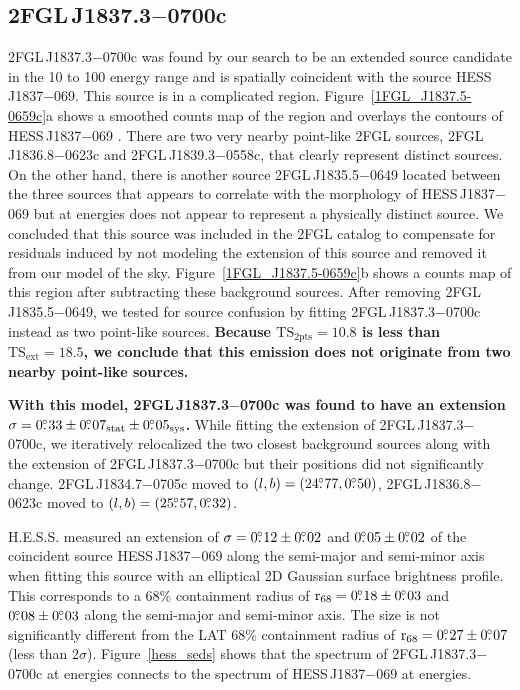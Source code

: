 \documentclass[12pt,preprint]{aastex}
\newcommand{\gev}{\text{GeV}\xspace}
\newcommand{\tev}{\text{TeV}\xspace}
\newcommand{\tsext}{{\ensuremath{\text{TS}_{\text{ext}}}}\xspace}
\newcommand{\tsinc}{\ensuremath{\text{TS}_{\text{2pts}}}\xspace}
\newcommand{\rsixeight}{{\ensuremath{\text{r}_{68}}}\xspace}
\newcommand{\sys}{\text{sys}\xspace}
\newcommand{\stat}{\text{stat}\xspace}
\newcommand{\newtext}[1]{{\bfseries \color{red}#1}}
\begin{document}
\subsection{2FGL\,J1837.3$-$0700c}
\label{section_2FGL_J1837.3-0700c}



2FGL\,J1837.3$-$0700c was found by our search to be an extended source
candidate in the 10 \gev to 100 \gev energy range and is spatially
coincident with the \tev source HESS\,J1837$-$069.  This source is
in a complicated region.  Figure~\ref{1FGL_J1837.5-0659c}a shows a
smoothed counts map of the region and overlays the \tev contours of
HESS\,J1837$-$069 \citep{hess_plane_survey}.  There are two very nearby
point-like 2FGL sources, 2FGL\,J1836.8$-$0623c and 2FGL\,J1839.3$-$0558c,
that clearly represent distinct sources.  On the other hand, there is
another source 2FGL\,J1835.5$-$0649 located between the three sources that
appears to correlate with the \tev morphology of HESS\,J1837$-$069 but
at \gev energies
does not appear to represent a physically distinct source.  We concluded
that this source was included in the 2FGL catalog to compensate for residuals induced by
not modeling the extension of this source and removed it from our model
of the sky.  Figure~\ref{1FGL_J1837.5-0659c}b shows a
counts map of this region after subtracting these background sources.
After removing 2FGL\,J1835.5$-$0649,
we tested for
source confusion by fitting 
2FGL\,J1837.3$-$0700c
instead as two point-like sources.
\newtext{Because $\tsinc=10.8$ is less than $\tsext=18.5$, we conclude that this emission
does not originate from two nearby point-like sources.}

\newtext{With this model, 2FGL\,J1837.3$-$0700c was found to have an
extension $\sigma=0\fdg33\pm0\fdg07_\stat\pm0\fdg05_\sys$.}
While fitting the extension of 2FGL\,J1837.3$-$0700c,
we iteratively relocalized the two closest
background sources along with the extension of 2FGL\,J1837.3$-$0700c but
their positions did not significantly change.  2FGL\,J1834.7$-$0705c
moved to $(l,b)=(24\mbox{$.\!\!^\circ$}77,0\mbox{$.\!\!^\circ$}50)$, 2FGL\,J1836.8$-$0623c moved
to $(l,b)=(25\mbox{$.\!\!^\circ$}57,0\mbox{$.\!\!^\circ$}32)$. 

H.E.S.S. measured an extension of
$\sigma=0\mbox{$.\!\!^\circ$}12\pm0\mbox{$.\!\!^\circ$}02$ and $0\mbox{$.\!\!^\circ$}05\pm0\mbox{$.\!\!^\circ$}02$ 
of the coincident \tev source HESS\,J1837$-$069 
along the semi-major and semi-minor axis when fitting this source
with an elliptical 2D Gaussian surface brightness profile.  This corresponds
to a 68\% containment radius of $\rsixeight=0\fdg18\pm0\fdg03$ and
$0\mbox{$.\!\!^\circ$}08\pm0\mbox{$.\!\!^\circ$}03$ along the semi-major and semi-minor axis. The
size is not significantly different from the LAT 68\% containment
radius of $\rsixeight=0\fdg27\pm0\fdg07$ (less than $2\sigma$).
Figure~\ref{hess_seds} shows that the spectrum of 2FGL\,J1837.3$-$0700c
at \gev energies connects to the spectrum of HESS\,J1837$-$069 at \tev
energies.
\end{document}
